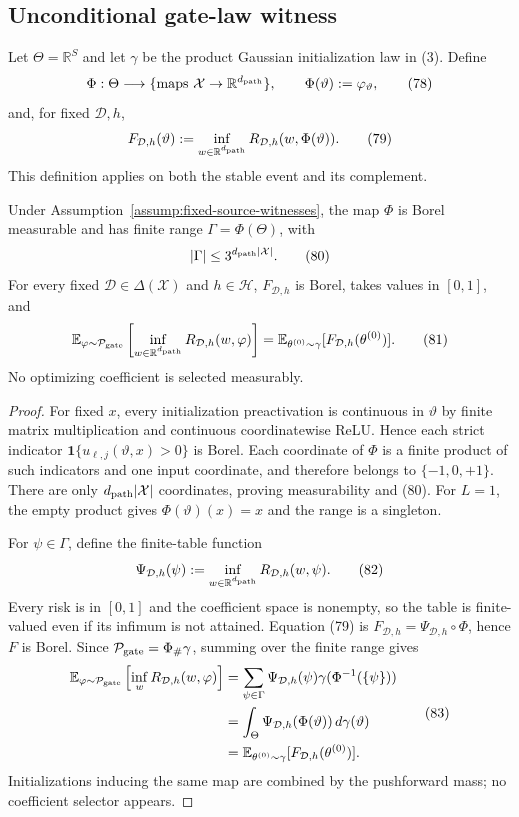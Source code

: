 \subsection{Unconditional gate-law witness}
\label{app:step006-witness}

Let $\Theta=\mathbb R^S$ and let $\gamma$ be the product Gaussian
initialization law in (3).  Define
\[
\Phi:\Theta\longrightarrow\{\text{maps }\mathcal X\to\mathbb R^{d_{\rm path}}\},
\qquad \Phi(\vartheta):=\varphi_\vartheta,
\tag{78}
\]
and, for fixed $\mathcal D,h$,
\[
F_{\mathcal D,h}(\vartheta):=
\inf_{w\in\mathbb R^{d_{\rm path}}}
R_{\mathcal D,h}(w,\Phi(\vartheta)).
\tag{79}
\]
This definition applies on both the stable event and its complement.

\begin{lemma}
\label{lem:p1-i3-step006-gate-pushforward}
Under Assumption~\ref{assump:fixed-source-witnesses}, the map $\Phi$ is Borel
measurable and has finite range $\Gamma=\Phi(\Theta)$, with
\[
|\Gamma|\leq3^{d_{\rm path}|\mathcal X|}.
\tag{80}
\]
For every fixed $\mathcal D\in\Delta(\mathcal X)$ and $h\in\mathcal H$,
$F_{\mathcal D,h}$ is Borel, takes values in $[0,1]$, and
\[
\mathbb E_{\varphi\sim\mathcal P_{\rm gate}}
\left[\inf_{w\in\mathbb R^{d_{\rm path}}}
R_{\mathcal D,h}(w,\varphi)\right]
=\mathbb E_{\theta^{(0)}\sim\gamma}
[F_{\mathcal D,h}(\theta^{(0)})].
\tag{81}
\]
No optimizing coefficient is selected measurably.
\end{lemma}

\begin{proof}
For fixed $x$, every initialization preactivation is continuous in
$\vartheta$ by finite matrix multiplication and continuous coordinatewise
ReLU.  Hence each strict indicator
$\mathbf1\{u_{\ell,j}(\vartheta,x)>0\}$ is Borel.  Each coordinate of $\Phi$
is a finite product of such indicators and one input coordinate, and therefore
belongs to $\{-1,0,+1\}$.  There are only
$d_{\rm path}|\mathcal X|$ coordinates, proving measurability and (80).
For $L=1$, the empty product gives $\Phi(\vartheta)(x)=x$ and the range is a
singleton.

For $\psi\in\Gamma$, define the finite-table function
\[
\Psi_{\mathcal D,h}(\psi):=
\inf_{w\in\mathbb R^{d_{\rm path}}}R_{\mathcal D,h}(w,\psi).
\tag{82}
\]
Every risk is in $[0,1]$ and the coefficient space is nonempty, so the table
is finite-valued even if its infimum is not attained.  Equation (79) is
$F_{\mathcal D,h}=\Psi_{\mathcal D,h}\circ\Phi$, hence $F$ is Borel.  Since
$\mathcal P_{\rm gate}=\Phi_\#\gamma$, summing over the finite range gives
\[
\begin{aligned}
\mathbb E_{\varphi\sim\mathcal P_{\rm gate}}
\left[\inf_wR_{\mathcal D,h}(w,\varphi)\right]
&=\sum_{\psi\in\Gamma}\Psi_{\mathcal D,h}(\psi)
\gamma(\Phi^{-1}(\{\psi\}))\\
&=\int_\Theta\Psi_{\mathcal D,h}(\Phi(\vartheta))\,d\gamma(\vartheta)\\
&=\mathbb E_{\theta^{(0)}\sim\gamma}[F_{\mathcal D,h}(\theta^{(0)})].
\end{aligned}
\tag{83}
\]
Initializations inducing the same map are combined by the pushforward mass;
no coefficient selector appears.
\end{proof}

